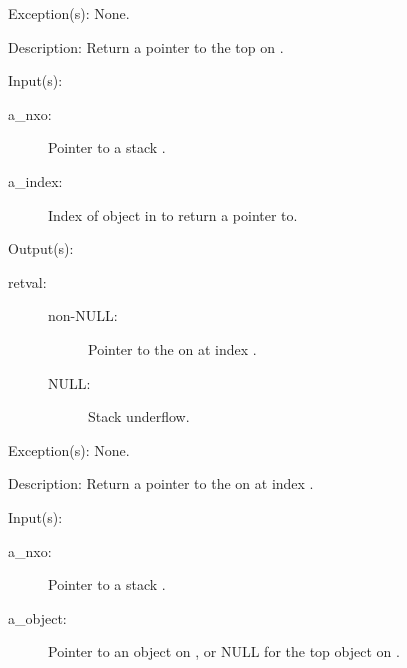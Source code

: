 \begin{capi}
\begin{capilist}
\begin{description}
		\end{description}
	\item[Exception(s): ] None.
	\item[Description: ]
		Return a pointer to the top  on .
	\end{capilist}
\label{nxo_stack_nget}
	\begin{capilist}
	\item[Input(s): ]
		\begin{description}\item[]
		\item[a\_nxo: ]
			Pointer to a stack .
		\item[a\_index: ]
			Index of object in  to return a pointer to.
		\end{description}
	\item[Output(s): ]
		\begin{description}\item[]
		\item[retval: ]
			\begin{description}\item[]
			\item[non-NULL: ]
				Pointer to the  on  at
				index .
			\item[NULL: ]
				Stack underflow.
			\end{description}
		\end{description}
	\item[Exception(s): ] None.
	\item[Description: ]
		Return a pointer to the  on  at index
		.
	\end{capilist}
\label{nxo_stack_down_get}
	\begin{capilist}
	\item[Input(s): ]
		\begin{description}\item[]
		\item[a\_nxo: ]
			Pointer to a stack \classname{nxo}.
		\item[a\_object: ]
			Pointer to an object on , or NULL for the
			top object on \cvar{a\_nxo}.
		\end{description}

\end{capilist}
\end{capi}
